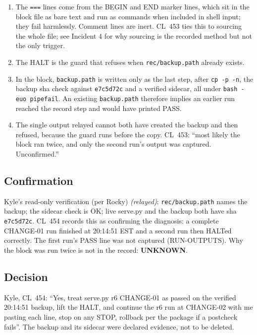 \documentclass[10pt]{article}
\newcommand{\CL}[1]{CL~#1}
\newcommand{\relay}{\textit{(relayed)}}
\newcommand{\unk}{\textbf{UNKNOWN}}
\begin{document}
\begin{enumerate}[leftmargin=1.5em,itemsep=0.1em]
\item The \texttt{===} lines come from the BEGIN and END marker lines, which sit in the block file as bare text and run as commands when included in shell input; they fail harmlessly. Comment lines are inert. \CL{453} ties this to sourcing the whole file; see Incident 4 for why sourcing is the recorded method but not the only trigger.
\item The HALT is the guard that refuses when \texttt{rec/backup.path} already exists.
\item In the block, \texttt{backup.path} is written only as the last step, after \texttt{cp -p -n}, the backup sha check against \texttt{e7c5d72c} and a verified sidecar, all under \texttt{bash -euo pipefail}. An existing \texttt{backup.path} therefore implies an earlier run reached the record step and would have printed PASS.
\item The single output relayed cannot both have created the backup and then refused, because the guard runs before the copy. \CL{453}: ``most likely the block ran twice, and only the second run's output was captured. Unconfirmed.''
\end{enumerate}

\subsection{Confirmation}

Kyle's read-only verification (per Rocky) \relay{}: \texttt{rec/backup.path} names the backup; the sidecar check is OK; live serve.py and the backup both have sha \texttt{e7c5d72c}. \CL{454} records this as confirming the diagnosis: a complete CHANGE-01 run finished at 20:14:51 EST and a second run then HALTed correctly. The first run's PASS line was not captured (RUN-OUTPUTS). Why the block was run twice is not in the record: \unk{}.

\subsection{Decision}

Kyle, \CL{454}: ``Yes, treat serve.py r6 CHANGE-01 as passed on the verified 20:14:51 backup, lift the HALT, and continue the r6 run at CHANGE-02 with me pasting each line, stop on any STOP, rollback per the package if a postcheck fails''. The backup and its sidecar were declared evidence, not to be deleted.
\end{document}
